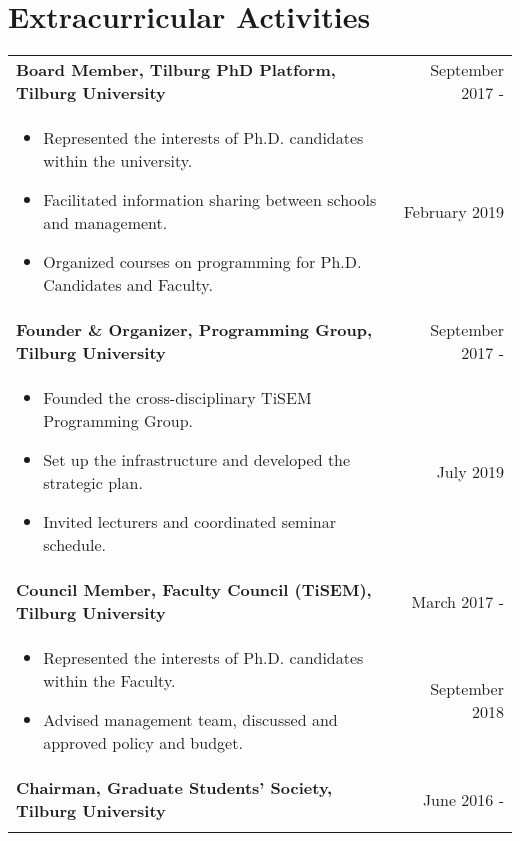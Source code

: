 \documentclass[a4paper,9pt]{article}
\begin{document}
\section{Extracurricular Activities }

\begin{tabular}{p{15cm}r}
\textbf{Board Member, Tilburg PhD Platform, Tilburg University}  &September 2017 -\\ \vspace{-0.5em}
  \begin{itemize}
    \item Represented the interests of Ph.D. candidates within the university.
    \item Facilitated information sharing between schools and management.
    \item Organized courses on programming for Ph.D. Candidates and Faculty.
  \end{itemize} & February 2019\phantom{ -}\vspace{-1.0em}\\
\textbf{Founder \& Organizer, Programming Group, Tilburg University}  &September 2017 -\\ \vspace{-0.5em}
  \begin{itemize}[noitemsep]
    \item Founded the cross-disciplinary TiSEM Programming Group.
    \item Set up the infrastructure and developed the strategic plan.
    \item Invited lecturers and coordinated seminar schedule.
  \end{itemize} & July 2019\phantom{ -}\vspace{-1.0em} \\
\textbf{Council Member, Faculty Council (TiSEM), Tilburg University}  &March 2017 -\\ \vspace{-0.5em}
  \begin{itemize}[noitemsep]
    \item Represented the interests of Ph.D. candidates within the Faculty.
    \item Advised management team, discussed and approved policy and budget.
  \end{itemize} & September 2018\phantom{ -}\vspace{-1.0em} \\
\textbf{Chairman, Graduate Students' Society, Tilburg University}  &June 2016 -\\ \vspace{-0.5em}

\end{tabular}
\end{document}

